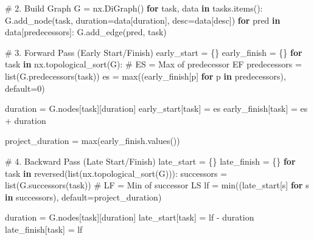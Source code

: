 \documentclass[
  letterpaper,
  DIV=11,
  numbers=noendperiod]{scrreprt}
\newenvironment{Shaded}{\begin{snugshade}}{\end{snugshade}}
\newcommand{\BuiltInTok}[1]{\textcolor[rgb]{0.00,0.23,0.31}{#1}}
\newcommand{\CommentTok}[1]{\textcolor[rgb]{0.37,0.37,0.37}{#1}}
\newcommand{\ControlFlowTok}[1]{\textcolor[rgb]{0.00,0.23,0.31}{\textbf{#1}}}
\newcommand{\DecValTok}[1]{\textcolor[rgb]{0.68,0.00,0.00}{#1}}
\newcommand{\KeywordTok}[1]{\textcolor[rgb]{0.00,0.23,0.31}{\textbf{#1}}}
\newcommand{\NormalTok}[1]{\textcolor[rgb]{0.00,0.23,0.31}{#1}}
\newcommand{\OperatorTok}[1]{\textcolor[rgb]{0.37,0.37,0.37}{#1}}
\newcommand{\StringTok}[1]{\textcolor[rgb]{0.13,0.47,0.30}{#1}}
\begin{document}
\begin{Shaded}
\begin{Highlighting}[]
\CommentTok{\# 2. Build Graph}
\NormalTok{G }\OperatorTok{=}\NormalTok{ nx.DiGraph()}
\ControlFlowTok{for}\NormalTok{ task, data }\KeywordTok{in}\NormalTok{ tasks.items():}
\NormalTok{    G.add\_node(task, duration}\OperatorTok{=}\NormalTok{data[}\StringTok{\textquotesingle{}duration\textquotesingle{}}\NormalTok{], desc}\OperatorTok{=}\NormalTok{data[}\StringTok{\textquotesingle{}desc\textquotesingle{}}\NormalTok{])}
    \ControlFlowTok{for}\NormalTok{ pred }\KeywordTok{in}\NormalTok{ data[}\StringTok{\textquotesingle{}predecessors\textquotesingle{}}\NormalTok{]:}
\NormalTok{        G.add\_edge(pred, task)}

\CommentTok{\# 3. Forward Pass (Early Start/Finish)}
\NormalTok{early\_start }\OperatorTok{=}\NormalTok{ \{\}}
\NormalTok{early\_finish }\OperatorTok{=}\NormalTok{ \{\}}
\ControlFlowTok{for}\NormalTok{ task }\KeywordTok{in}\NormalTok{ nx.topological\_sort(G):}
    \CommentTok{\# ES = Max of predecessor EF}
\NormalTok{    predecessors }\OperatorTok{=} \BuiltInTok{list}\NormalTok{(G.predecessors(task))}
\NormalTok{    es }\OperatorTok{=} \BuiltInTok{max}\NormalTok{((early\_finish[p] }\ControlFlowTok{for}\NormalTok{ p }\KeywordTok{in}\NormalTok{ predecessors), default}\OperatorTok{=}\DecValTok{0}\NormalTok{)}
    
\NormalTok{    duration }\OperatorTok{=}\NormalTok{ G.nodes[task][}\StringTok{\textquotesingle{}duration\textquotesingle{}}\NormalTok{]}
\NormalTok{    early\_start[task] }\OperatorTok{=}\NormalTok{ es}
\NormalTok{    early\_finish[task] }\OperatorTok{=}\NormalTok{ es }\OperatorTok{+}\NormalTok{ duration}

\NormalTok{project\_duration }\OperatorTok{=} \BuiltInTok{max}\NormalTok{(early\_finish.values())}

\CommentTok{\# 4. Backward Pass (Late Start/Finish)}
\NormalTok{late\_start }\OperatorTok{=}\NormalTok{ \{\}}
\NormalTok{late\_finish }\OperatorTok{=}\NormalTok{ \{\}}
\ControlFlowTok{for}\NormalTok{ task }\KeywordTok{in} \BuiltInTok{reversed}\NormalTok{(}\BuiltInTok{list}\NormalTok{(nx.topological\_sort(G))):}
\NormalTok{    successors }\OperatorTok{=} \BuiltInTok{list}\NormalTok{(G.successors(task))}
    \CommentTok{\# LF = Min of successor LS}
\NormalTok{    lf }\OperatorTok{=} \BuiltInTok{min}\NormalTok{((late\_start[s] }\ControlFlowTok{for}\NormalTok{ s }\KeywordTok{in}\NormalTok{ successors), default}\OperatorTok{=}\NormalTok{project\_duration)}
    
\NormalTok{    duration }\OperatorTok{=}\NormalTok{ G.nodes[task][}\StringTok{\textquotesingle{}duration\textquotesingle{}}\NormalTok{]}
\NormalTok{    late\_start[task] }\OperatorTok{=}\NormalTok{ lf }\OperatorTok{{-}}\NormalTok{ duration}
\NormalTok{    late\_finish[task] }\OperatorTok{=}\NormalTok{ lf}


\end{Highlighting}
\end{Shaded}
\end{document}
